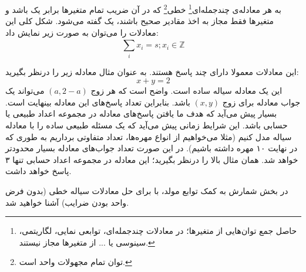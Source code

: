 


\begin{DEFINITION}
    \p
    به هر معادله‌ی چندجمله‌ای\footnote{حاصل جمع توان‌هایی از متغیر‌ها؛ در معادلات چندجمله‌ای،
    توابعی نمایی، لگاریتمی، سینوسی یا ... از متغیر‌ها مجاز نیستند.}
    خطی\footnote{توان تمام مجهولات واحد است.}
    که در آن ضریب تمام متغیر‌ها برابر یک باشد
    و متغیر‌ها فقط مجاز به اخذ مقادیر صحیح باشند،
    یک
    گفته می‌شود.
    شکل کلی این معادلات را می‌توان به صورت زیر نمایش داد:
    $$\sum\limits_{i}^{} {x_i} = s ; x_i \in \mathbb{Z}$$
\end{DEFINITION}

\p
این معادلات معمولا دارای چند پاسخ هستند.
به عنوان مثال معادله زیر را درنظر بگیرید:
$$x + y = 2$$
این یک معادله سیاله ساده است.
واضح است که هر زوج
$(a, 2-a)$
می‌تواند یک جواب معادله برای زوج
$(x,y)$
باشد. بنابراین تعداد پاسخ‌های این معادله بینهایت است.
بسیار پیش می‌آید که هدف ما یافتن پاسخ‌های معادله در مجموعه اعداد طبیعی یا حسابی باشد.
این شرایط زمانی پیش می‌آید که یک مسئله طبیعی ساده را با معادله سیاله مدل کنیم
(مثلا می‌خواهیم از انواع مهره‌ها، تعداد متفاوتی برداریم به طوری که در نهایت ۱۰ مهره داشته باشیم).
در این صورت تعداد جواب‌های معادله بسیار محدود‌تر خواهد شد.
همان مثال بالا را درنظر بگیرید؛ این معادله در مجموعه اعداد حسابی تنها ۳ پاسخ خواهد داشت.






\p
در بخش 
 شمارش به کمک توابع مولد، با
برای حل معادلات سیاله خطی (بدون فرض واحد بودن ضرایب)
آشنا خواهید شد.